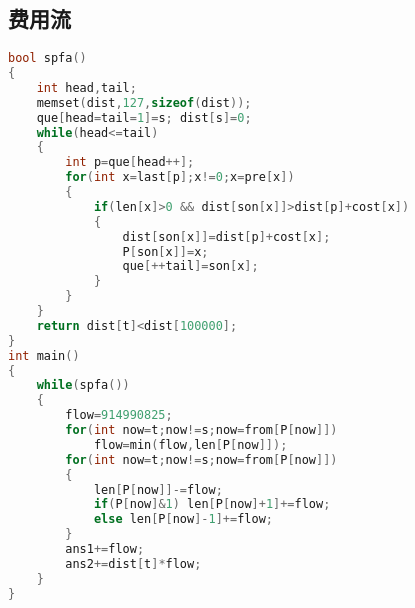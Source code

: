 \subsection{费用流}
    \begin{lstlisting}[language=c++]
bool spfa()
{
    int head,tail;
	memset(dist,127,sizeof(dist));	
	que[head=tail=1]=s; dist[s]=0;
	while(head<=tail)
	{
		int p=que[head++];
		for(int x=last[p];x!=0;x=pre[x])
		{
			if(len[x]>0 && dist[son[x]]>dist[p]+cost[x])
			{
				dist[son[x]]=dist[p]+cost[x];
				P[son[x]]=x;
				que[++tail]=son[x];	
			}	
		}	
	}
	return dist[t]<dist[100000];
}
int main()
{
	while(spfa())
	{
		flow=914990825;
		for(int now=t;now!=s;now=from[P[now]])
			flow=min(flow,len[P[now]]);
		for(int now=t;now!=s;now=from[P[now]])
		{
			len[P[now]]-=flow;	
			if(P[now]&1) len[P[now]+1]+=flow;
			else len[P[now]-1]+=flow;
		}
		ans1+=flow;
		ans2+=dist[t]*flow;
	}
}
    \end{lstlisting}
